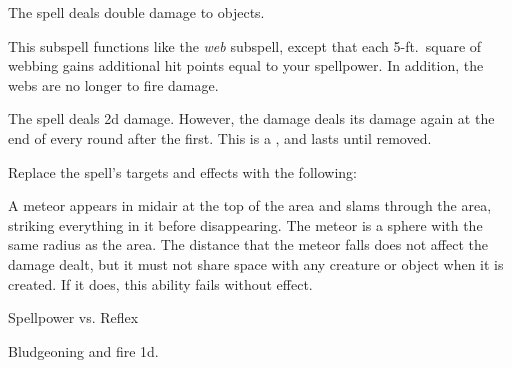 The spell deals double damage to objects.






This subspell functions like the \textit{web} subspell, except that each 5-ft.\ square of webbing gains additional hit points equal to your spellpower.
In addition, the webs are no longer  to fire damage.







The spell deals \minus2d damage.
However, the damage deals its damage again at the end of every round after the first.
This is a , and lasts until removed.









Replace the spell's targets and effects with the following:
\begin{spellcontent}

\begin{augmenttargetinginfo}




\end{augmenttargetinginfo}


\begin{augmenteffects}



\spelleffect
A meteor appears in midair at the top of the area and slams through the area, striking everything in it before disappearing.
The meteor is a sphere with the same radius as the area.
The distance that the meteor falls does not affect the damage dealt, but it must not share space with any creature or object when it is created.
If it does, this ability fails without effect.




\begin{spellattack}{Spellpower vs. Reflex}


\hit Bludgeoning and fire  \minus1d.


\end{spellattack}





\end{augmenteffects}

\end{spellcontent}





